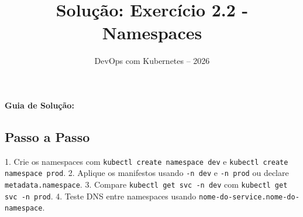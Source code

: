 \documentclass[11pt,a4paper]{article}
\title{\color{secondary}\Huge\textbf{Solução: Exercício 2.2 - Namespaces}}
\author{\color{primary}DevOps com Kubernetes -- 2026}
\date{}
\begin{document}
\maketitle


\textbf{Guia de Solução:}

\subsection*{\color{secondary}Passo a Passo}

1. Crie os namespaces com \texttt{kubectl create namespace dev} e \texttt{kubectl create namespace prod}.
2. Aplique os manifestos usando \texttt{-n dev} e \texttt{-n prod} ou declare \texttt{metadata.namespace}.
3. Compare \texttt{kubectl get svc -n dev} com \texttt{kubectl get svc -n prod}.
4. Teste DNS entre namespaces usando \texttt{nome-do-service.nome-do-namespace}.
\end{document}
